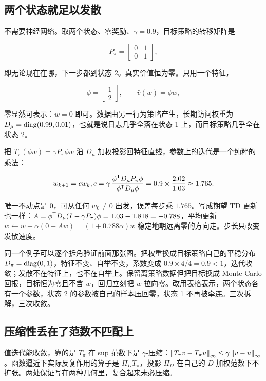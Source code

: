 \subsection{两个状态就足以发散}

不需要神经网络。取两个状态、零奖励、\(\gamma=0.9\)，目标策略的转移矩阵是

\[
P_\pi=
\begin{bmatrix}
0&1\\
0&1
\end{bmatrix},
\]

即无论现在在哪，下一步都到状态 2。真实价值恒为零。只用一个特征，

\[
\phi=\begin{bmatrix}1\\2\end{bmatrix},
\qquad
\widehat v(w)=\phi w,
\]

零显然可表示：\(w=0\) 即可。数据由另一行为策略产生，长期访问权重为 \(D_\mu=\operatorname{diag}(0.99,0.01)\)，也就是说日志几乎全落在状态 1 上，而目标策略几乎全在状态 2。

把 \(T_\pi(\phi w)=\gamma P_\pi\phi w\) 沿 \(D_\mu\) 加权投影回特征直线，参数上的迭代是一个纯粹的乘法：

\[
w_{k+1}=cw_k,
\space
c=\gamma\,\frac{\phi^{\mathsf{T}}D_\mu P_\pi\phi}{\phi^{\mathsf{T}}D_\mu\phi}
=0.9\times\frac{2.02}{1.03}
\approx1.765.
\]

唯一不动点是 \(0\)，可从任何 \(w_0\neq0\) 出发，误差每步乘 \(1.765\)。写成期望 TD 更新也一样：\(A=\phi^{\mathsf{T}}D_\mu(I-\gamma P_\pi)\phi=1.03-1.818=-0.788\)，平均更新 \(w\leftarrow w+\alpha(0-Aw)=(1+0.788\alpha)w\) 稳定地朝远离零的方向走。步长只改变发散速度。

同一个例子可以逐个拆角验证前面那张图。把权重换成目标策略自己的平稳分布 \(D_\pi=\operatorname{diag}(0,1)\)，特征不变、自举不变，系数变成 \(0.9\times 4/4=0.9<1\)，迭代收敛；发散不在特征上，也不在自举上。保留离策略数据但把目标换成 Monte Carlo 回报，目标恒为零且不含 \(w\)，回归立刻把 \(w\) 拉向零。改用表格表示，两个状态各有一个参数，状态 2 的参数被自己的样本压回零，状态 1 不再被牵连。三次拆解，三次收敛。

\subsection{压缩性丢在了范数不匹配上}

值迭代能收敛，靠的是 \(T_\pi\) 在 sup 范数下是 \(\gamma\)-压缩：\(\left\lVert T_\pi v-T_\pi u\right\rVert_\infty\le\gamma\left\lVert v-u\right\rVert_\infty\)。函数逼近下实际反复作用的算子是 \(\Pi_D T_\pi\)，投影 \(\Pi_D\) 在自己的 \(D\)-加权范数下不扩张。两处保证写在两种几何里，复合起来未必压缩。

